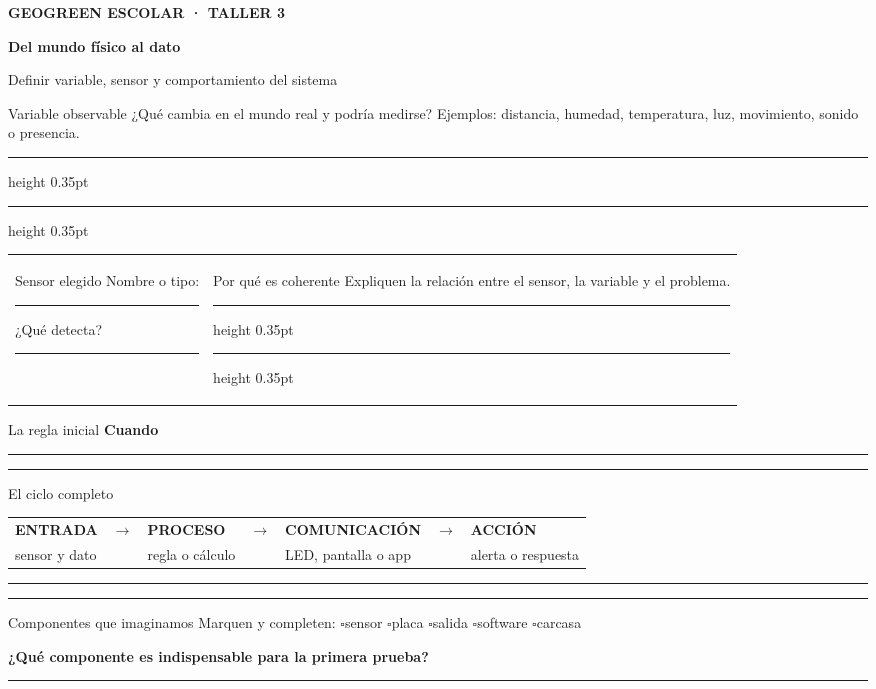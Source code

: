 \documentclass[10pt,a4paper]{article}
\newcommand{\writearea}[1]{\vspace{#1}\hrule height 0.35pt\vspace{4mm}\hrule height 0.35pt}
\newcommand{\checkline}[1]{$\square$\hspace{1.5mm}#1}
\newcommand{\pagehead}[2]{%
  {\small\bfseries\textcolor{AIEPRed}{GEOGREEN ESCOLAR · TALLER 3}}\par
  \vspace{2mm}
  {\LARGE\bfseries\color{AIEPNavy}#1\par}
  {\normalsize\color{AIEPMuted}#2\par}
  \vspace{4mm}
}
\begin{document}
\newpage
\pagehead{Del mundo físico al dato}{Definir variable, sensor y comportamiento del sistema}

\begin{fieldbox}[height=40mm]{Variable observable}
¿Qué cambia en el mundo real y podría medirse? Ejemplos: distancia, humedad, temperatura, luz, movimiento, sonido o presencia.
\writearea{13mm}
\end{fieldbox}

\begin{tabularx}{\textwidth}{@{}Y Y@{}}
\begin{fieldbox}[height=47mm]{Sensor elegido}
Nombre o tipo:\par\vspace{7mm}\hrule
\vspace{5mm}
¿Qué detecta?\par\vspace{7mm}\hrule
\end{fieldbox}
&
\begin{fieldbox}[height=47mm]{Por qué es coherente}
Expliquen la relación entre el sensor, la variable y el problema.
\writearea{16mm}
\end{fieldbox}
\end{tabularx}

\begin{accentfield}{La regla inicial}
{\large\bfseries\color{AIEPNavy}Cuando} \rule{63mm}{0.35pt}
 \rule{63mm}{0.35pt}
\vspace{5mm}
\end{accentfield}

\begin{fieldbox}[height=54mm]{El ciclo completo}
\begin{tabularx}{\textwidth}{@{}C{30mm}C{5mm}C{30mm}C{5mm}C{30mm}C{5mm}C{30mm}@{}}
\textbf{\color{AIEPNavy}ENTRADA} & $\rightarrow$ &
\textbf{\color{AIEPNavy}PROCESO} & $\rightarrow$ &
\textbf{\color{AIEPNavy}COMUNICACIÓN} & $\rightarrow$ &
\textbf{\color{AIEPNavy}ACCIÓN}\\
sensor y dato && regla o cálculo && LED, pantalla o app && alerta o respuesta\\
\end{tabularx}
\vspace{7mm}
\hrule
\vspace{8mm}
\hrule
\end{fieldbox}

\begin{fieldbox}[height=43mm]{Componentes que imaginamos}
Marquen y completen: \quad
\checkline{sensor}\quad
\checkline{placa}\quad
\checkline{salida}\quad
\checkline{software}\quad
\checkline{carcasa}\par
\vspace{6mm}
\textbf{¿Qué componente es indispensable para la primera prueba?}\par
\vspace{7mm}\hrule
\end{fieldbox}
\end{document}
